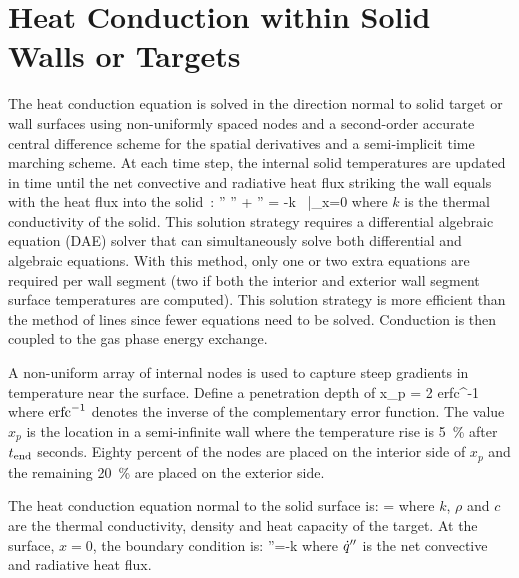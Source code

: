 \documentclass[12pt]{book}
\begin{document}
\section{Heat Conduction within Solid Walls or Targets}

The heat conduction equation is solved in the direction normal to solid target or wall surfaces using non-uniformly spaced nodes and a second-order accurate central difference scheme for the spatial derivatives and a semi-implicit time marching scheme. At each time step, the internal solid temperatures are updated in time until the net convective and radiative heat flux striking the wall equals with the heat flux into the solid~\cite{Moss:1992}:
\be
   \dq'' \equiv \dqr'' + \dqc'' = -k \,  \Big|_{x=0}
\ee
where $k$ is the thermal conductivity of the solid.  This solution strategy requires a differential algebraic equation (DAE) solver that can simultaneously solve both differential and algebraic equations.  With this method, only one or two extra equations are required per wall segment (two if both the interior and exterior wall segment surface temperatures are computed).  This solution strategy is more efficient than the method of lines since fewer equations need to be solved. Conduction is then coupled to the gas phase energy exchange.

A non-uniform array of internal nodes is used to capture steep gradients in temperature near the surface. Define a penetration depth of
\be
   x_p = 2  \; \hbox{erfc}^{-1} 
\ee
where $\hbox{erfc}^{-1}$ denotes the inverse of the complementary error function. The value $x_p$ is the location in a semi-infinite wall where the temperature rise is 5~\% after $t_{\rm end}$ seconds. Eighty percent of the nodes are placed on the interior side of $x_p$ and the remaining 20~\% are placed on the exterior side.

The heat conduction equation normal to the solid surface is:
\be {} = 
\label{eq:Target_PDE} \ee
where $k$, $\rho$ and $c$ are the thermal conductivity, density and heat capacity of the target. At the surface, $x=0$, the boundary condition is:
\be
   \dq''=-k \label{eq:Target_Fourier}
\ee
where $\dot{q}''$ is the net convective and radiative heat flux.

\newcommand{\Dt}{\Delta t}
\newcommand{\Dr}{\Delta r}
\newcommand{\Tipo}{T_{i+1}^{n+1}}
\newcommand{\Ti}{T_{i}^{n+1}}
\newcommand{\Timo}{T_{i-1}^{n+1}}
\end{document}

